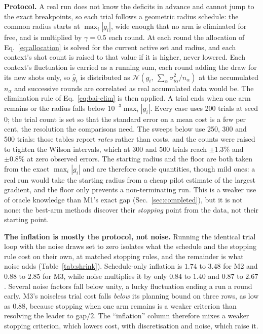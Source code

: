 \documentclass[10pt]{article}
\begin{document}
\textbf{Protocol.} A real run does not know the deficits in advance and cannot
jump to the exact breakpoints, so each trial follows a geometric radius schedule:
the common radius starts at $\max_i|g_i|$, wide enough that no arm is eliminated
for free, and is multiplied by $\gamma=0.5$ each round. At each round the
allocation of Eq.~\eqref{eq:allocation} is solved for the current active set and
radius, and each context's shot count is raised to that value if it is higher,
never lowered. Each context's fluctuation is carried as a running sum, each round
adding the draw for its new shots only, so $\widehat g_i$ is distributed as
$\mathcal N\!\left(g_i,\ \sum_\alpha\sigma_{i\alpha}^2/n_\alpha\right)$ at the
accumulated $n_\alpha$ and successive rounds are correlated as real accumulated
data would be. The elimination rule of Eq.~\eqref{eq:bai-elim} is then
applied. A trial ends when one arm remains or the radius falls below
$10^{-3}\max_i|g_i|$. Every case uses 200 trials at seed $0$; the trial count is
set so that the standard error on a mean cost is a few per cent, the resolution
the comparisons need. The sweeps below use 250, 300 and 500 trials: those tables
report \emph{rates} rather than costs, and the counts were raised to tighten the
Wilson intervals, which at 300 and 500 trials reach $\pm1.3\%$ and $\pm0.8\%$ at
zero observed errors. The starting radius and the floor are both taken
from the exact $\max_i|g_i|$ and are therefore oracle quantities, though mild ones:
a real run would take the starting radius from a cheap pilot estimate of the
largest gradient, and the floor only prevents a non-terminating run. This is a
weaker use of oracle knowledge than M1's exact gap (Sec.~\ref{sec:completed}),
but it is not none: the best-arm methods discover their \emph{stopping} point
from the data, not their starting point.

\textbf{The inflation is mostly the protocol, not noise.} Running the identical
trial loop with the noise draws set to zero isolates what the schedule and the
stopping rule cost on their own, at matched stopping rules, and the remainder is
what noise adds (Table~\ref{tab:shrink}). Schedule-only inflation is $1.74$ to
$3.48$ for M2 and $0.88$ to $2.85$ for M3, while noise multiplies it by only
$0.84$ to $1.40$ and $0.87$ to $2.67$. Several noise factors fall below unity, a
lucky fluctuation ending a run a round early. M3's noiseless trial cost falls
\emph{below} its planning bound on three rows, as low as $0.88$, because stopping
when one arm remains is a weaker criterion than resolving the leader to
$\mathrm{gap}/2$. The ``inflation'' column therefore mixes a weaker stopping
criterion, which lowers cost, with discretisation and noise, which raise it.
\end{document}
